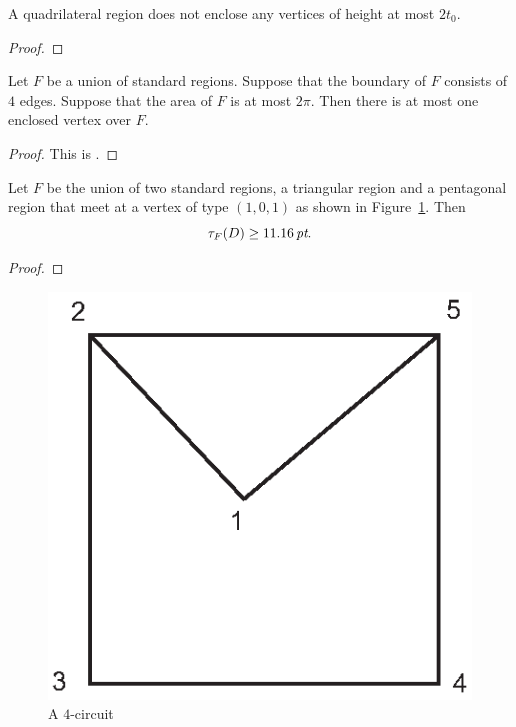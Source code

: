 \begin{lemma}\label{lemma:enclosed:bis} %
A quadrilateral region does not enclose any vertices of height at
most $2t_0$.
\end{lemma}

\begin{proof} 
\end{proof}

\begin{lemma}\label{lemma:no-2}
Let $F$ be a union of standard regions.    Suppose that the
boundary of $F$ consists of $4$ edges. Suppose that the area of
$F$ is at most $2\pi$.  Then there is at most one enclosed vertex
over $F$.
\end{lemma}

\begin{proof} This is \cite[Prop.~4.2]{part1}.
\end{proof}

\begin{lemma}\label{lemma:11.16:bis}
Let $F$ be the union of two standard regions, a triangular region
and a pentagonal region that meet at a vertex of type $(1,0,1)$ as
shown in Figure~\ref{fig:no4circuit:bis}.  Then
    $$\tau_F(D) \ge 11.16\,\hbox{\it pt}.$$
\end{lemma}

\begin{proof} 
\end{proof}

\begin{figure}[htb]
  \centering
  \includegraphics{PS/no4circuit.eps}
  \caption{A $4$-circuit}
  \label{fig:no4circuit:bis}
\end{figure}

